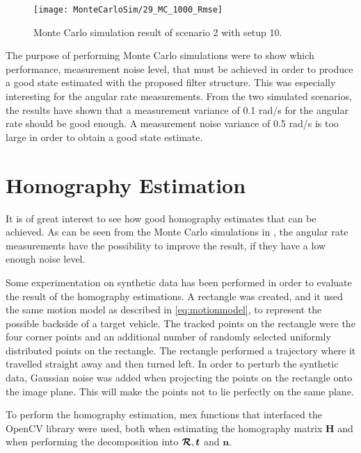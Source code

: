 \begin{figure}[!ht]
	\centering
	\texttt{[image: MonteCarloSim/29\_MC\_1000\_Rmse]}
	\caption{\label{fig:29montesimcrossingroiangvelcornerrmse} Monte Carlo simulation result of scenario 2 with setup 10.}
\end{figure}

\newpage

The purpose of performing Monte Carlo simulations were to show which performance, \ie measurement noise level, that must be achieved in order to produce a good state estimated with the proposed filter structure.
This was especially interesting for the angular rate measurements.
From the two simulated scenarios, the results have shown that a measurement variance of 0.1 rad/s for the angular rate should be good enough.
A measurement noise variance of 0.5 rad/s is too large in order to obtain a good state estimate.

\newpage

\section{Homography Estimation}
\label{sec:homographyestimationresults}
It is of great interest to see how good homography estimates that can be achieved.
As can be seen from the Monte Carlo simulations in , the angular rate measurements have the possibility to improve the result, if they have a low enough noise level.

Some experimentation on synthetic data has been performed in order to evaluate the result of the homography estimations.
A rectangle was created, and it used the same motion model as described in \eqref{eq:motionmodel}, to represent the possible backside of a target vehicle.
The tracked points on the rectangle were the four corner points and an additional number of randomly selected uniformly distributed points on the rectangle.
The rectangle performed a trajectory where it travelled straight away and then turned left.
In order to perturb the synthetic data, Gaussian noise was added when projecting the points on the rectangle onto the image plane.
This will make the points not to lie perfectly on the same plane.

To perform the homography estimation, \matlab mex functions that interfaced the OpenCV library \cite{mexopencv} were used, both when estimating the homography matrix $\bm{H}$ and when performing the decomposition into $\bm{\mathcal{R}}, \bm{t}$ and $\bm{n}$.

